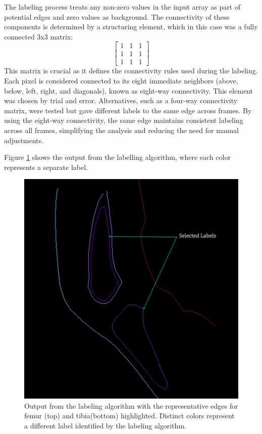 \documentclass{micro-econ-thesis}
\begin{document}
The labeling process treats any non-zero values in the input array as part of potential edges and zero values as background. The connectivity of these components is determined by a structuring element, which in this case was a fully connected 3x3 matrix:
$$
\begin{bmatrix}
	1 & 1 & 1 \\
	1 & 1 & 1 \\
	1 & 1 & 1
\end{bmatrix}
$$
This matrix is crucial as it defines the connectivity rules used during the labeling. Each pixel is considered connected to its eight immediate neighbors (above, below, left, right, and diagonals), known as eight-way connectivity. This element was chosen by trial and error. Alternatives, such as a four-way connectivity matrix, were tested but gave different labels to the same edge across frames. By using the eight-way connectivity, the same edge maintains consistent labeling across all frames, simplifying the analysis and reducing the need for manual adjustments. 

Figure \ref{fig:labelimg} shows the output from the labelling algorithm, where each color represents a separate label. 

\begin{figure}[H]
	\centering
	\includegraphics[width=0.7\linewidth]{label_selected}
	\caption{Output from the labeling algorithm with the representative edges for femur (top) and tibia(bottom) highlighted. Distinct colors represent a different label identified by the labeling algorithm.}
	\label{fig:labelimg}
\end{figure}
 
\end{document}
